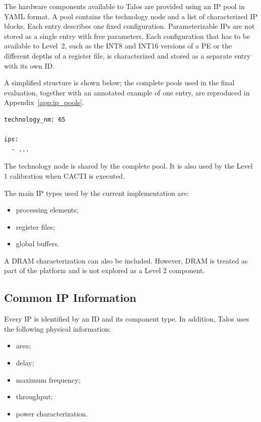 The hardware components available to Talos are provided using an IP
pool in YAML format. A pool contains the technology node and a list of
characterized IP blocks. Each entry describes one fixed configuration.
Parameterizable IPs are not stored as a single entry with free
parameters. Each configuration that has to be available to Level~2,
such as the INT8 and INT16 versions of a PE or the different depths of
a register file, is characterized and stored as a separate entry with
its own ID.

A simplified structure is shown below; the complete pools used in the
final evaluation, together with an annotated example of one entry, are
reproduced in Appendix~\ref{app:ip_pools}.

\begin{verbatim}
technology_nm: 65

ips:
  - ...
\end{verbatim}

The technology node is shared by the complete pool. It is also used by
the Level 1 calibration when CACTI is executed.

The main IP types used by the current implementation are:

\begin{itemize}
    \item processing elements;
    \item register files;
    \item global buffers.
\end{itemize}

A DRAM characterization can also be included. However, DRAM is treated
as part of the platform and is not explored as a Level 2 component.


\subsection{Common IP Information}

Every IP is identified by an ID and its component type. In addition,
Talos uses the following physical information:

\begin{itemize}
    \item area;
    \item delay;
    \item maximum frequency;
    \item throughput;
    \item power characterization.
\end{itemize}

